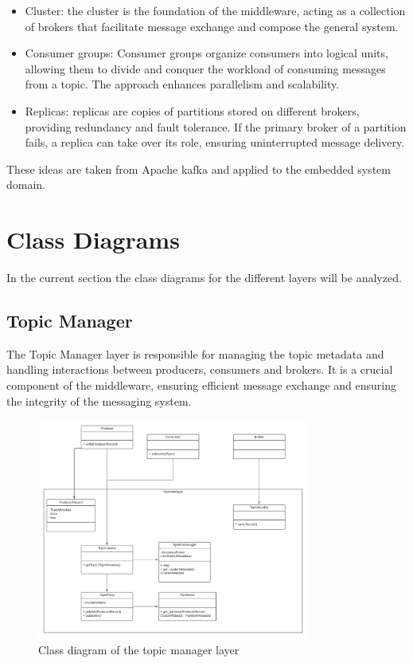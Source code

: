 \begin{itemize}
    \item   Cluster: the cluster is the foundation of the middleware, acting as
            a collection of brokers that facilitate message exchange and
            compose the general system.
    \item   Consumer groups: Consumer groups organize consumers into logical
            units, allowing them to divide and conquer the workload of
            consuming messages from a topic. The approach enhances parallelism
            and scalability.
    \item   Replicas: replicas are copies of partitions stored on different
            brokers, providing redundancy and fault tolerance. If the primary
            broker of a partition fails, a replica can take over its role,
            ensuring uninterrupted message delivery.
\end{itemize}

These ideas are taken from Apache kafka and applied to the embedded system
domain.

\section{Class Diagrams}

In the current section the class diagrams for the different layers will be
analyzed.

\subsection{Topic Manager}

The Topic Manager layer is responsible for managing the topic metadata and
handling interactions between producers, consumers and brokers. It is a crucial
component of the middleware, ensuring efficient message exchange and ensuring
the integrity of the messaging system.

\begin{figure}[H]
    \centering
    \includegraphics[width=0.8\textwidth]{Figures/class_diagram_topic_manager.png}
    \caption{Class diagram of the topic manager layer}
    \label{fig:class_diagram_topic_manager}
\end{figure}

